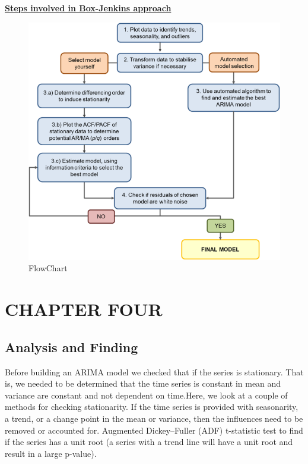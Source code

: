 \documentclass[12pt,a4paper]{book}
\begin{document}
{\uline{\textbf{Steps involved in Box-Jenkins approach}}

\begin{figure}

{\centering \includegraphics{Images/Steps.png}

}

\caption{FlowChart}

\end{figure}

\hypertarget{chapter-four}{%
\chapter{CHAPTER FOUR}\label{chapter-four}}

\hypertarget{analysis-and-finding}{%
\section{Analysis and Finding}\label{analysis-and-finding}}

Before building an ARIMA model we checked that if the series is
stationary. That is, we needed to be determined that the time series is
constant in mean and variance are constant and not dependent on
time.Here, we look at a couple of methods for checking stationarity. If
the time series is provided with seasonarity, a trend, or a change point
in the mean or variance, then the influences need to be removed or
accounted for. Augmented Dickey--Fuller (ADF) t-statistic test to find
if the series has a unit root (a series with a trend line will have a
unit root and result in a large p-value).

}
\end{document}
